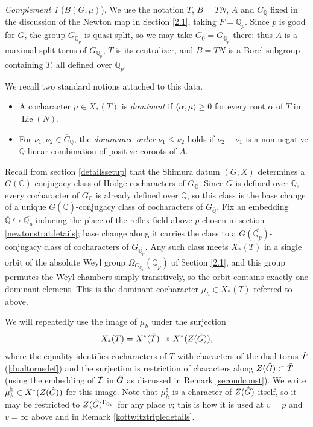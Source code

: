 \documentclass[11pt,a4paper]{article}
\theoremstyle{definition}
\theoremstyle{plain}
\theoremstyle{remark}
\newtheorem{Rc}[shared]{Complement}
\theoremstyle{plain}
\DeclareMathOperator{\Lie}{Lie}
\begin{document}
\begin{Rc}[$B(G,\mu)$]\label{BGmudef}
    We use the notation $T$, $B = TN$, $A$ and $\overline{C}_{\mathbb{Q}}$ fixed in the discussion of the Newton map in Section \ref{2.1}, taking $F = \mathbb{Q}_p$. Since $p$ is good for $G$, the group $G_{\mathbb{Q}_p}$ is quasi-split, so we may take $G_0 = G_{\mathbb{Q}_p}$ there: thus $A$ is a maximal split torus of $G_{\mathbb{Q}_p}$, $T$ is its centralizer, and $B = TN$ is a Borel subgroup containing $T$, all defined over $\mathbb{Q}_p$.

    We recall two standard notions attached to this data.
    \begin{itemize}
        \item A cocharacter $\mu \in X_*(T)$ is \textit{dominant} if $\langle \alpha, \mu \rangle \geq 0$ for every root $\alpha$ of $T$ in $\Lie(N)$.
        \item For $\nu_1, \nu_2 \in \overline{C}_{\mathbb{Q}}$, the \textit{dominance order} $\nu_1 \leq \nu_2$ holds if $\nu_2 - \nu_1$ is a non-negative $\mathbb{Q}$-linear combination of positive coroots of $A$.
    \end{itemize}

    Recall from section \ref{detailssetup} that the Shimura datum $(G,X)$ determines a $G(\mathbb{C})$-conjugacy class of Hodge cocharacters of $G_{\mathbb{C}}$. Since $G$ is defined over $\mathbb{Q}$, every cocharacter of $G_{\mathbb{C}}$ is already defined over $\overline{\mathbb{Q}}$, so this class is the base change of a unique $G(\overline{\mathbb{Q}})$-conjugacy class of cocharacters of $G_{\overline{\mathbb{Q}}}$. Fix an embedding $\overline{\mathbb{Q}} \hookrightarrow \overline{\mathbb{Q}_p}$ inducing the place of the reflex field above $p$ chosen in section \ref{newtonstratdetails}; base change along it carries the class to a $G(\overline{\mathbb{Q}_p})$-conjugacy class of cocharacters of $G_{\overline{\mathbb{Q}_p}}$. Any such class meets $X_*(T)$ in a single orbit of the absolute Weyl group $\Omega_{G_{\mathbb{Q}_p}}(\overline{\mathbb{Q}_p})$ of Section \ref{2.1}, and this group permutes the Weyl chambers simply transitively, so the orbit contains exactly one dominant element. This is the dominant cocharacter $\mu_h \in X_*(T)$ referred to above.

    We will repeatedly use the image of $\mu_h$ under the surjection
    $$X_*(T) = X^*(\Hat{T}) \twoheadrightarrow X^*(Z(\Hat{G})),$$
    where the equality identifies cocharacters of $T$ with characters of the dual torus $\Hat{T}$ (\ref{dualtorusdef}) and the surjection is restriction of characters along $Z(\Hat{G}) \subset \Hat{T}$ (using the embedding of $\Hat{T}$ in $\Hat{G}$ as discussed in Remark \ref{secondconst}). We write $\mu_h^{\natural} \in X^*(Z(\Hat{G}))$ for this image. Note that $\mu_h^{\natural}$ is a character of $Z(\Hat{G})$ itself, so it may be restricted to $Z(\Hat{G})^{\Gamma_{\mathbb{Q}_v}}$ for any place $v$; this is how it is used at $v = p$ and $v = \infty$ above and in Remark \ref{kottwitztripledetails}.


\end{Rc}
\end{document}
